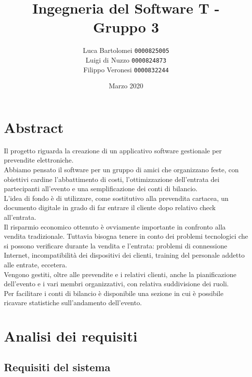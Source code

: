 \documentclass[a4paper]{article}
\title{Ingegneria del Software T - Gruppo 3}
\author{
    Luca Bartolomei 
    \texttt{0000825005}
    \\
    Luigi di Nuzzo
    \texttt{0000824873}
    \\
    Filippo Veronesi
    \texttt{0000832244}
}
\date{Marzo 2020}
\begin{document}
\newcommand{\mc}[2]{\multicolumn{#1}{>{\setlength{\hsize}{#1\hsize}}X|}{#2}}
\newcommand{\mcc}[2]{\multicolumn{#1}{|l|}{#2}}

\maketitle

\tableofcontents

\newpage

\section{Abstract}

Il progetto riguarda la creazione di un applicativo software gestionale per prevendite elettroniche.\\Abbiamo pensato il software per un gruppo di amici che organizzano feste, con obiettivi cardine l'abbattimento di costi, l'ottimizzazione dell'entrata dei partecipanti all'evento e una semplificazione dei conti di bilancio.\\L'idea di fondo è di utilizzare, come sostitutivo alla prevendita cartacea, un documento digitale in grado di far entrare il cliente dopo relativo check all'entrata.\\Il risparmio economico ottenuto è ovviamente importante in confronto alla vendita tradizionale. Tuttavia bisogna tenere in conto dei problemi tecnologici che si possono verificare durante la vendita e l'entrata: problemi di connessione Internet, incompatibilità dei dispositivi dei clienti, training del personale addetto alle entrate, eccetera.\\Vengono gestiti, oltre alle prevendite e i relativi clienti, anche la pianificazione dell'evento e i vari membri organizzativi, con relativa suddivisione dei ruoli.\\Per facilitare i conti di bilancio è disponibile una sezione in cui è possibile ricavare statistiche sull'andamento dell'evento.

\newpage

\section{Analisi dei requisiti}

\subsection{Requisiti del sistema}
\end{document}
